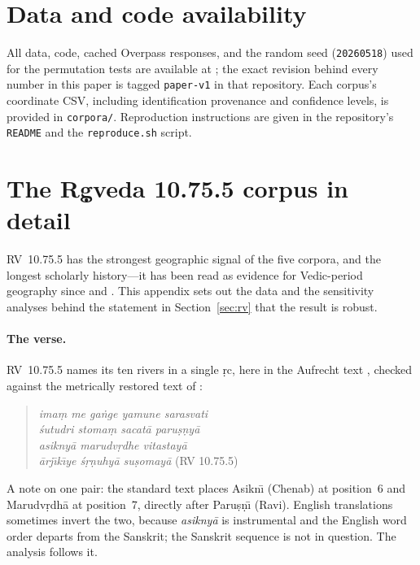 \documentclass[11pt]{article}
\begin{document}
\section*{Data and code availability}
All data, code, cached Overpass responses, and the random seed
(\texttt{20260518}) used for the permutation tests are available at
\citep{repo2026}; the exact revision behind every number in this
paper is tagged \texttt{paper-v1} in that repository. Each corpus's
coordinate CSV, including identification provenance and confidence
levels, is provided in \texttt{corpora/}. Reproduction instructions
are given in the repository's \texttt{README} and the
\texttt{reproduce.sh} script.

\appendix
\section{The R\d{g}veda 10.75.5 corpus in detail}\label{app:rv}

RV~10.75.5 has the strongest geographic signal of the five corpora,
and the longest scholarly history---it has been read as evidence for
Vedic-period geography since \citet{roth1846} and \citet{zimmer1879}.
This appendix sets out the data and the sensitivity analyses behind
the statement in Section~\ref{sec:rv} that the result is robust.

\paragraph{The verse.}
RV~10.75.5 names its ten rivers in a single \d{r}c, here in the
Aufrecht text \citep{aufrecht1877}, checked against the metrically
restored text of \citet{vannooten-holland1994}:

\begin{quote}
\textit{ima\d{m} me ga\.{n}ge yamune sarasvati\\
\'sutudri stoma\d{m} sacat\={a} paru\d{s}\d{n}y\={a}\\
asikny\={a} marudv\d{r}dhe vitastay\={a}\\
\={a}rj\={\i}k\={\i}ye \'s\d{r}\d{n}uhy\={a} su\d{s}omay\={a}}
\hspace{1.5em}(RV 10.75.5)
\end{quote}

A note on one pair: the standard text places Asikn\={\i} (Chenab) at
position~6 and Marudv\d{r}dh\={a} at position~7, directly after
Paru\d{s}\d{n}\={\i} (Ravi). English translations sometimes invert
the two, because \textit{asikny\={a}} is instrumental and the
English word order departs from the Sanskrit; the Sanskrit sequence
is not in question. The analysis follows it.
\end{document}
